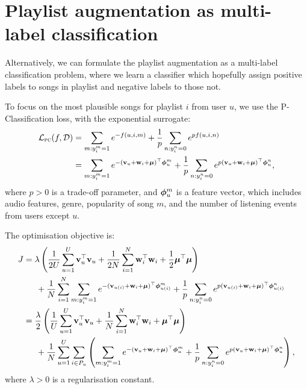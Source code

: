 \section{Playlist augmentation as multi-label classification}

Alternatively, we can formulate the playlist augmentation as a multi-label classification problem,
where we learn a classifier which hopefully assign positive labels to songs in playlist and negative labels to those not.

To focus on the most plausible songs for playlist $i$ from user $u$,
we use the P-Classification loss, with the exponential surrogate:
\begin{equation*}
\begin{aligned}
\mathcal{L}_\textsc{pc}(f, \mathcal{D}) 
&= \sum_{m: y_i^m = 1} e^{-f(u, i, m)} + \frac{1}{p} \sum_{n: y_i^n = 0} e^{p f(u, i, n)} \\
&= \sum_{m: y_i^m = 1} e^{-(\mathbf{v}_u + \mathbf{w}_i + \bm{\mu})^\top \bm{\phi}_u^m} 
   + \frac{1}{p} \sum_{n: y_i^n = 0} e^{p (\mathbf{v}_u + \mathbf{w}_i + \bm{\mu})^\top \bm{\phi}_u^n},
\end{aligned}
\end{equation*}
where $p > 0$ is a trade-off parameter,
and $\bm{\phi}_u^m$ is a feature vector,
which includes audio features, genre, popularity of song $m$,
and the number of listening events from users except $u$.

The optimisation objective is:
\begin{equation*}
\begin{aligned}
J &= \lambda \left( \frac{1}{2 U} \sum_{u=1}^U \mathbf{v}_u^\top \mathbf{v}_u 
     + \frac{1}{2 N} \sum_{i=1}^N \mathbf{w}_i^\top \mathbf{w}_i + \frac{1}{2} \bm{\mu}^\top \bm{\mu} \right) \\
& \hspace{1.5em}
     + \frac{1}{N} \sum_{i=1}^N \sum_{m: y_i^m = 1} e^{-(\mathbf{v}_{u(i)} + \mathbf{w}_i + \bm{\mu})^\top \bm{\phi}_{u(i)}^m} 
     + \frac{1}{p} \sum_{n: y_i^n = 0} e^{p (\mathbf{v}_{u(i)} + \mathbf{w}_i + \bm{\mu})^\top \bm{\phi}_{u(i)}^n} \\
&= \frac{\lambda}{2} \left( \frac{1}{U} \sum_{u=1}^U \mathbf{v}_u^\top \mathbf{v}_u 
     + \frac{1}{N} \sum_{i=1}^N \mathbf{w}_i^\top \mathbf{w}_i + \bm{\mu}^\top \bm{\mu} \right) \\
& \hspace{1.5em}
     + \frac{1}{N} \sum_{u=1}^U \sum_{i \in P_u} \left(
       \sum_{m: y_i^m = 1} e^{-(\mathbf{v}_{u} + \mathbf{w}_i + \bm{\mu})^\top \bm{\phi}_u^m} 
       + \frac{1}{p} \sum_{n: y_i^n = 0} e^{p (\mathbf{v}_{u} + \mathbf{w}_i + \bm{\mu})^\top \bm{\phi}_u^n} \right),
\end{aligned}
\end{equation*}
where $\lambda > 0$ is a regularisation constant.

